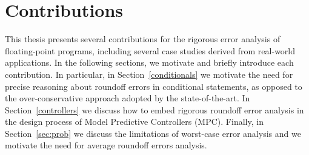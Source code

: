 %
%
%
%
\section{Contributions}
%
This thesis presents several contributions for the rigorous error analysis of floating-point programs, including several case studies derived from real-world applications.
%
%
%
In the following sections, we motivate and briefly introduce each contribution.
%
In particular, in Section~\ref{conditionals} we motivate the need for precise reasoning about roundoff errors in conditional statements, as opposed to the over-conservative approach adopted by the state-of-the-art.
%
In Section~\ref{controllers} we discuss how to embed rigorous roundoff error analysis in the design process of Model Predictive Controllers (MPC).
%
Finally, in Section~\ref{sec:prob} we discuss the limitations of worst-case error analysis and we motivate the need for average roundoff errors analysis. 
%
%
%

